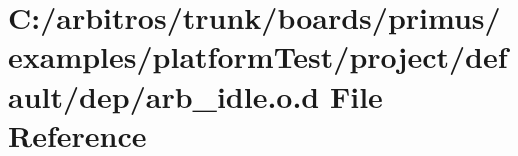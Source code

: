 \hypertarget{platform_test_2project_2default_2dep_2arb__idle_8o_8d}{\section{C\-:/arbitros/trunk/boards/primus/examples/platform\-Test/project/default/dep/arb\-\_\-idle.o.\-d File Reference}
\label{platform_test_2project_2default_2dep_2arb__idle_8o_8d}
}

